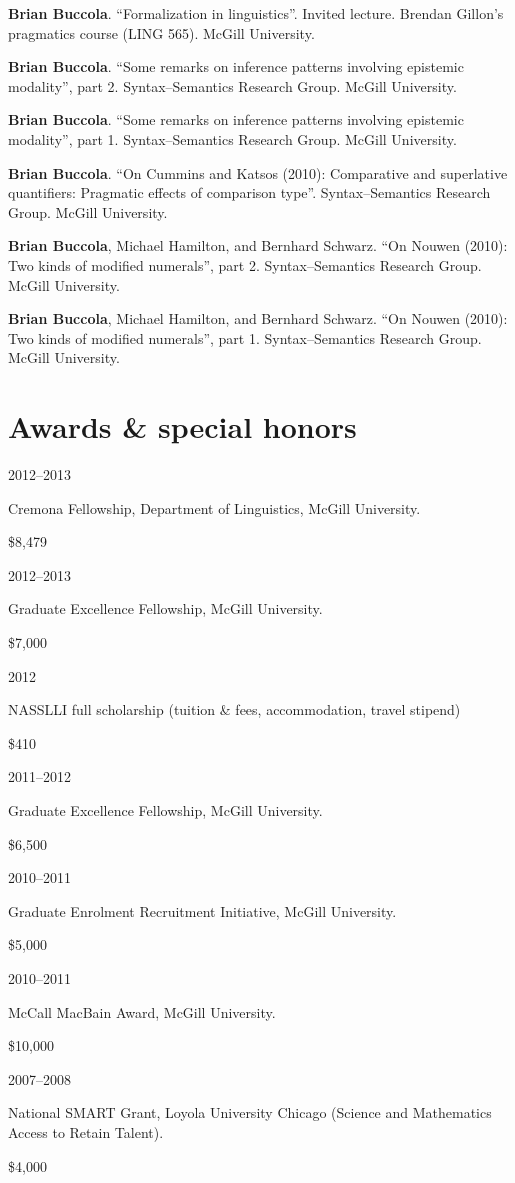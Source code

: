 \documentclass[11pt,letterpaper]{article}
\newcommand{\name}{Brian Buccola}
\newcommand{\cvitem}[2]{%
  \begin{minipage}[t]{0.24\textwidth}
    #1 %
  \end{minipage}
  \hfill
  \begin{minipage}[t]{0.74\textwidth}
    #2 %
  \end{minipage}
}
\newcommand{\award}[2]{%
  \begin{minipage}[t]{0.78\textwidth}
    #1        %
  \end{minipage}
  \hfill
  \begin{minipage}[t]{0.20\textwidth}
    \hfill #2 %
  \end{minipage}
}
\begin{document}
\cvitem{}{\textbf{\name}. ``Formalization in
linguistics''. Invited lecture. Brendan Gillon's pragmatics course (LING 565).
McGill University.}

\cvitem{}{\textbf{\name}. ``Some remarks on inference
patterns involving epistemic modality'', part 2. Syntax--Semantics Research
Group.  McGill University.}

\cvitem{}{\textbf{\name}. ``Some remarks on inference
patterns involving epistemic modality'', part 1. Syntax--Semantics Research
Group.  McGill University.}

\cvitem{}{\textbf{\name}. ``On Cummins and Katsos
(2010): Comparative and superlative quantifiers: Pragmatic effects of
comparison type''.  Syntax--Semantics Research Group. McGill University.}

\cvitem{}{\textbf{\name}, Michael Hamilton, and
Bernhard Schwarz.  ``On Nouwen (2010): Two kinds of modified numerals'', part
2.  Syntax--Semantics Research Group. McGill University.}

\cvitem{}{\textbf{\name}, Michael Hamilton, and Bernhard
Schwarz.  ``On Nouwen (2010): Two kinds of modified numerals'', part 1.
Syntax--Semantics Research Group. McGill University.}



\section*{Awards \& special honors}

\cvitem{2012--2013}{\award{Cremona Fellowship, Department of Linguistics, McGill
University.}{\$8,479}}

\cvitem{2012--2013}{\award{Graduate Excellence Fellowship, McGill
University.}{\$7,000}}

\cvitem{2012}{\award{NASSLLI full scholarship (tuition \& fees, accommodation,
travel stipend)}{\$410}}

\cvitem{2011--2012}{\award{Graduate Excellence Fellowship, McGill
University.}{\$6,500}}

\cvitem{2010--2011}{\award{Graduate Enrolment Recruitment Initiative, McGill
University.}{\$5,000}}

\cvitem{2010--2011}{\award{McCall MacBain Award, McGill University.}{\$10,000}}

\cvitem{2007--2008}{\award{National SMART Grant, Loyola University Chicago
(Science and Mathematics Access to Retain Talent).}{\$4,000}}
\end{document}
